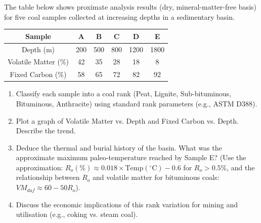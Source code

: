 \documentclass[11pt]{article}
\begin{document}
\begin{exercice}
The table below shows proximate analysis results (dry, mineral-matter-free basis) for five coal samples collected at increasing depths in a sedimentary basin.

\begin{center}
\begin{tabular}{|c|ccccc|}\hline
Sample & A & B & C & D & E \\ \hline
Depth (m) & 200 & 500 & 800 & 1200 & 1800 \\
Volatile Matter (\%) & 42 & 35 & 28 & 18 & 8 \\
Fixed Carbon (\%) & 58 & 65 & 72 & 82 & 92 \\ \hline
\end{tabular}
\end{center}

\begin{enumerate}
\item Classify each sample into a coal rank (Peat, Lignite, Sub-bituminous, Bituminous, Anthracite) using standard rank parameters (e.g., ASTM D388).
\item Plot a graph of Volatile Matter vs. Depth and Fixed Carbon vs. Depth. Describe the trend.
\item Deduce the thermal and burial history of the basin. What was the approximate maximum paleo-temperature reached by Sample E? (Use the approximation: $R_o (\%) \approx 0.018 \times \text{Temp}(^\circ\mathrm{C}) - 0.6$ for $R_o > 0.5\%$, and the relationship between $R_o$ and volatile matter for bituminous coals: $VM_{daf} \approx 60 - 50 R_o$).
\item Discuss the economic implications of this rank variation for mining and utilisation (e.g., coking vs. steam coal).
\end{enumerate}
\end{exercice}
\end{document}
